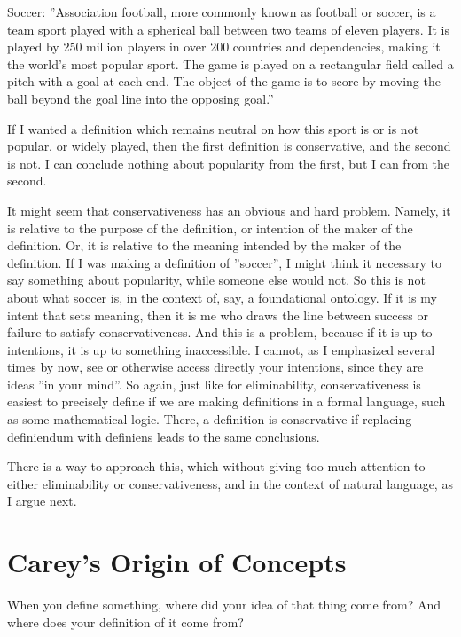 \begin{svgraybox}
Soccer: ''Association football, more commonly known as football or soccer, is a team sport played with a spherical ball between two teams of eleven players. It is played by 250 million players in over 200 countries and dependencies, making it the world's most popular sport. The game is played on a rectangular field called a pitch with a goal at each end. The object of the game is to score by moving the ball beyond the goal line into the opposing goal.'' \cite{wikipedia-association-football}
\end{svgraybox}

If I wanted a definition which remains neutral on how this sport is or is not popular, or widely played, then the first definition is conservative, and the second is not. I can conclude nothing about popularity from the first, but I can from the second. 

It might seem that conservativeness has an obvious and hard problem. Namely, it is relative to the purpose of the definition, or intention of the maker of the definition. Or, it is relative to the meaning intended by the maker of the definition. If I was making a definition of ''soccer'', I might think it necessary to say something about popularity, while someone else would not. So this is not about what soccer is, in the context of, say, a foundational ontology. If it is my intent that sets meaning, then it is me who draws the line between success or failure to satisfy conservativeness. And this is a problem, because if it is up to intentions, it is up to something inaccessible. I cannot, as I emphasized several times by now, see or otherwise access directly your intentions, since they are ideas ''in your mind''. So again, just like for eliminability, conservativeness is easiest to precisely define if we are making definitions in a formal language, such as some mathematical logic. There, a definition is conservative if replacing definiendum with definiens leads to the same conclusions.

There is a way to approach this, which without giving too much attention to either eliminability or conservativeness, and in the context of natural language, as I argue next.


\section{Carey's Origin of Concepts}
\label{c4:s4}
When you define something, where did your idea of that thing come from? And where does your definition of it come from?

